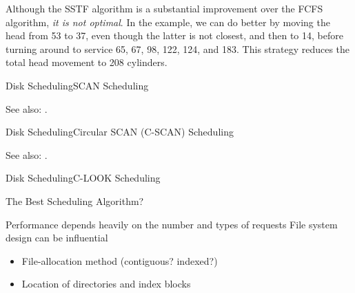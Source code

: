 Although the SSTF algorithm is a substantial improvement over the FCFS algorithm, \emph{it
  is not optimal}. In the example, we can do better by moving the head from 53 to 37, even
though the latter is not closest, and then to 14, before turning around to service 65, 67,
98, 122, 124, and 183. This strategy reduces the total head movement to 208 cylinders.

\begin{frame}{Disk Scheduling}{SCAN Scheduling}
  \begin{center}
     
  \end{center}
\end{frame}

See also: .

\begin{frame}{Disk Scheduling}{Circular SCAN (C-SCAN) Scheduling}
  \begin{center}
     
  \end{center}
\end{frame}

See also: .

\begin{frame}{Disk Scheduling}{C-LOOK Scheduling}
  \begin{center}
     
  \end{center}
\end{frame}

\begin{frame}{The Best Scheduling Algorithm?}
  \begin{block}{Performance depends heavily on the number and types of requests}
    File system design can be influential
    \begin{itemize}
    \item File-allocation method (contiguous? indexed?)
    \item Location of directories and index blocks
    \end{itemize}
  \end{block}
\end{frame}

